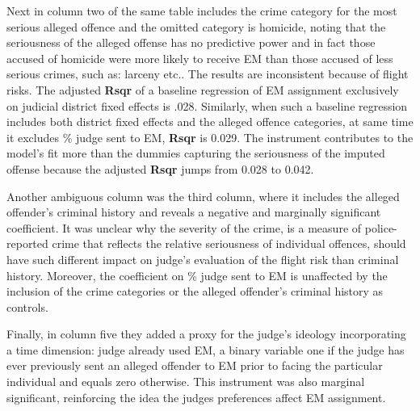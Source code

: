 \documentclass[a4paper,12pt]{article}
\begin{document}
Next in column two of the same table includes the crime category for the most serious alleged offence and the omitted category is homicide, noting that the seriousness of the alleged offense has no predictive power and in fact those accused of homicide were more likely to receive EM than those accused of less serious crimes, such as: larceny etc.. The results are inconsistent because of flight risks. The adjusted \textbf{Rsqr} of a baseline regression of EM assignment exclusively on judicial district fixed effects is .028. Similarly, when such a baseline regression includes both district fixed effects and the alleged offence categories, at same time it excludes \% judge sent to EM, \textbf{Rsqr} is 0.029. The instrument contributes to the model's fit more than the dummies capturing the seriousness of the imputed offense because the adjusted \textbf{Rsqr} jumps from 0.028 to 0.042.  

Another ambiguous column was the third column, where it includes the alleged offender's criminal history and reveals a negative and marginally significant coefficient. It was unclear why the severity of the crime, is a measure of police-reported crime that reflects the relative seriousness of individual offences, should have such different impact on judge's evaluation of the flight risk than criminal history. Moreover, the coefficient on \% judge sent to EM is unaffected by the inclusion of the crime categories or the alleged offender's criminal history as controls. 

Finally, in column five they added a proxy for the judge's ideology incorporating a time dimension: judge already used EM, a binary variable one if the judge has ever previously sent an alleged offender to EM prior to facing the particular individual and equals zero otherwise. This instrument was also marginal significant, reinforcing the idea the judges preferences affect EM assignment.  

\end{document}

